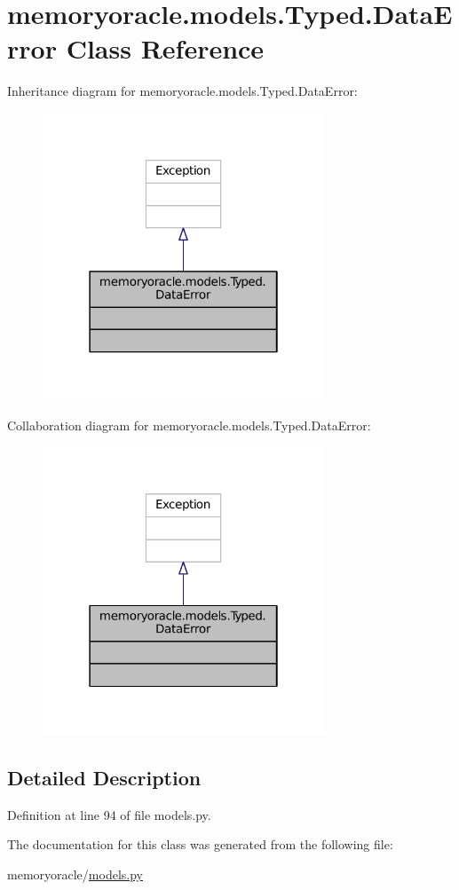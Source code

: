 \hypertarget{classmemoryoracle_1_1models_1_1Typed_1_1DataError}{}\section{memoryoracle.\+models.\+Typed.\+Data\+Error Class Reference}
\label{classmemoryoracle_1_1models_1_1Typed_1_1DataError}


Inheritance diagram for memoryoracle.\+models.\+Typed.\+Data\+Error\+:\nopagebreak
\begin{figure}[H]
\begin{center}
\leavevmode
\includegraphics[width=238pt]{classmemoryoracle_1_1models_1_1Typed_1_1DataError__inherit__graph}
\end{center}
\end{figure}


Collaboration diagram for memoryoracle.\+models.\+Typed.\+Data\+Error\+:\nopagebreak
\begin{figure}[H]
\begin{center}
\leavevmode
\includegraphics[width=238pt]{classmemoryoracle_1_1models_1_1Typed_1_1DataError__coll__graph}
\end{center}
\end{figure}


\subsection{Detailed Description}


Definition at line 94 of file models.\+py.



The documentation for this class was generated from the following file\+:\begin{DoxyCompactItemize}
\item 
memoryoracle/\hyperlink{models_8py}{models.\+py}\end{DoxyCompactItemize}
